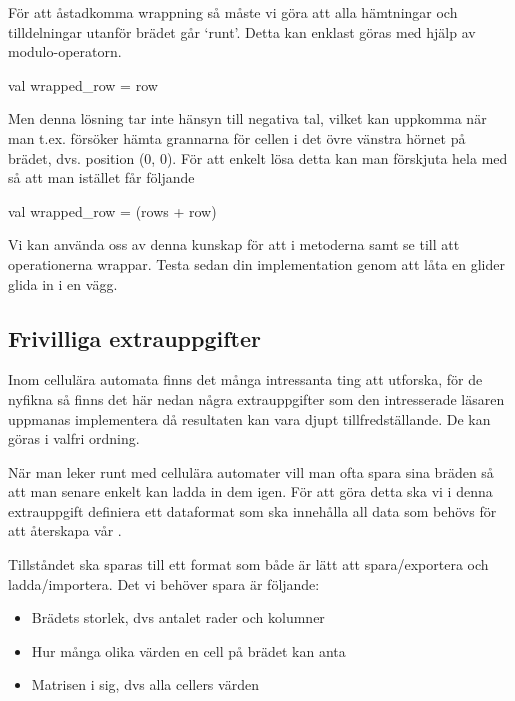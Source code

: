         
        För att åstadkomma wrappning så måste vi göra att alla hämtningar och tilldelningar utanför brädet går `runt'. Detta kan enklast göras med hjälp av modulo-operatorn.
        
\begin{Code}
val wrapped_row = row %
\end{Code}

		Men denna lösning tar inte hänsyn till negativa tal, vilket kan uppkomma när man t.ex. försöker hämta grannarna för cellen i det övre vänstra hörnet på brädet, dvs. position (0, 0). För att enkelt lösa detta kan man förskjuta hela  med  så att man istället får följande
		
\begin{Code}
val wrapped_row = (rows + row) %
\end{Code}

Vi kan använda oss av denna kunskap för att i metoderna  samt  se till att operationerna wrappar. Testa sedan din implementation genom att låta en glider glida in i en vägg.


\subsection{Frivilliga extrauppgifter}

Inom cellulära automata finns det många intressanta ting att utforska, för de nyfikna så finns det här nedan några extrauppgifter som den intresserade läsaren uppmanas implementera då resultaten kan vara djupt tillfredställande. De kan göras i valfri ordning.



	När man leker runt med cellulära automater vill man ofta spara sina bräden så att man senare enkelt kan ladda in dem igen. För att göra detta ska vi i denna extrauppgift definiera ett dataformat som ska innehålla all data som behövs för att återskapa vår .

        Tillståndet ska sparas till ett format som både är lätt att spara/exportera och ladda/importera. Det vi behöver spara är följande:
        
        \begin{itemize}
        		\item Brädets storlek, dvs antalet rader och kolumner
        		\item Hur många olika värden en cell på brädet kan anta
        		\item Matrisen i sig, dvs alla cellers värden
        	\end{itemize}
        	
